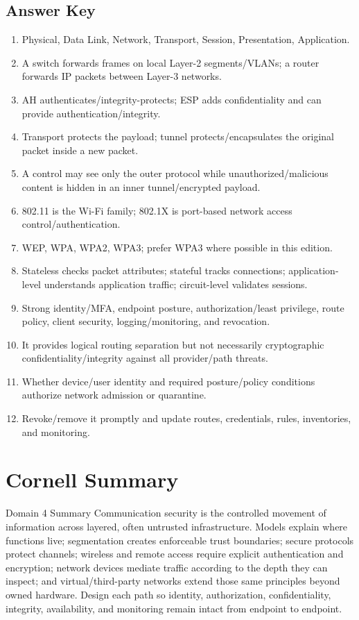 \documentclass[10pt,letterpaper]{article}
\begin{document}
\subsection*{Answer Key}
\begin{enumerate}
\item Physical, Data Link, Network, Transport, Session, Presentation, Application.
\item A switch forwards frames on local Layer-2 segments/VLANs; a router forwards IP packets between Layer-3 networks.
\item AH authenticates/integrity-protects; ESP adds confidentiality and can provide authentication/integrity.
\item Transport protects the payload; tunnel protects/encapsulates the original packet inside a new packet.
\item A control may see only the outer protocol while unauthorized/malicious content is hidden in an inner tunnel/encrypted payload.
\item 802.11 is the Wi-Fi family; 802.1X is port-based network access control/authentication.
\item WEP, WPA, WPA2, WPA3; prefer WPA3 where possible in this edition.
\item Stateless checks packet attributes; stateful tracks connections; application-level understands application traffic; circuit-level validates sessions.
\item Strong identity/MFA, endpoint posture, authorization/least privilege, route policy, client security, logging/monitoring, and revocation.
\item It provides logical routing separation but not necessarily cryptographic confidentiality/integrity against all provider/path threats.
\item Whether device/user identity and required posture/policy conditions authorize network admission or quarantine.
\item Revoke/remove it promptly and update routes, credentials, rules, inventories, and monitoring.
\end{enumerate}

\section{Cornell Summary}
\begin{summarybox}{Domain 4 Summary}
Communication security is the controlled movement of information across layered, often untrusted infrastructure. Models explain where functions live; segmentation creates enforceable trust boundaries; secure protocols protect channels; wireless and remote access require explicit authentication and encryption; network devices mediate traffic according to the depth they can inspect; and virtual/third-party networks extend those same principles beyond owned hardware. Design each path so identity, authorization, confidentiality, integrity, availability, and monitoring remain intact from endpoint to endpoint.
\end{summarybox}
\end{document}
